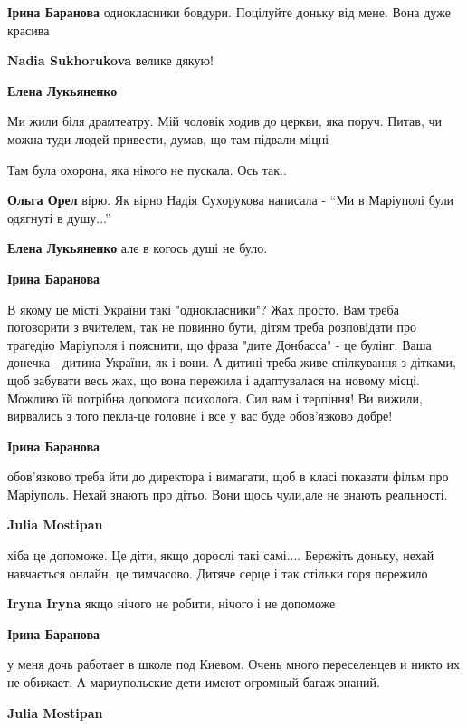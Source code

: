 \begin{itemize} %
\textbf{Ірина Баранова} однокласники бовдури. Поцілуйте доньку від мене. Вона дуже красива

\textbf{Nadia Sukhorukova} велике дякую! 💜

\textbf{Елена Лукьяненко} 

Ми жили біля драмтеатру. Мій чоловік ходив до церкви, яка поруч. Питав, чи
можна туди людей привести, думав, що там підвали міцні

Там була охорона, яка нікого не пускала. Ось так..

\textbf{Ольга Орел} вірю. Як вірно Надія Сухорукова написала - \enquote{Ми в Маріуполі були одягнуті в душу...}

\textbf{Елена Лукьяненко} але в когось душі не було.

\textbf{Ірина Баранова} 

В якому це місті України такі "однокласники"? Жах
просто. Вам треба поговорити з вчителем, так не повинно бути, дітям треба
розповідати про трагедію Маріуполя і пояснити, що фраза "дите Донбасса" - це
булінг. Ваша донечка - дитина України, як і вони. А дитині треба живе спілкування з
дітками, щоб забувати весь жах, що вона пережила і адаптувалася на новому
місці. Можливо їй потрібна допомога психолога. Сил вам і терпіння! Ви
вижили, вирвались з того пекла-це головне і все у вас буде обов'язково добре!

\textbf{Ірина Баранова} 

обов'язково треба йти до директора і вимагати, щоб в класі показати фільм про
Маріуполь. Нехай знають про дітьо. Вони щось чули,але не знають реальності.

\textbf{Julia Mostipan} 

хіба це допоможе. Це діти, якщо дорослі такі самі.... Бережіть доньку, нехай
навчається онлайн, це тимчасово. Дитяче серце і так стільки горя пережило

\textbf{Iryna Iryna} якщо нічого не робити, нічого і не допоможе

\textbf{Ірина Баранова} 

у меня дочь работает в школе под Киевом. Очень много переселенцев и никто их не
обижает. А мариупольские дети имеют огромный багаж знаний.

\textbf{Julia Mostipan} 


\end{itemize}
